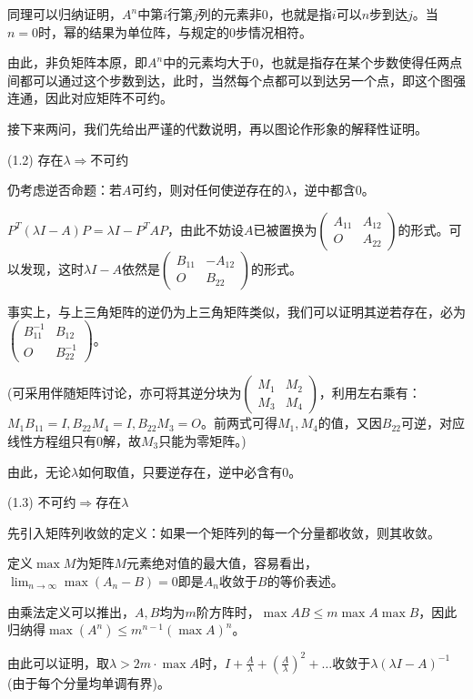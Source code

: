 \documentclass[a4paper,UTF8,fontset=windows]{ctexart}
\begin{document}
\begin{enumerate}
同理可以归纳证明，$A^n$中第$i$行第$j$列的元素非0，也就是指$i$可以$n$步到达$j$。当$n=0$时，幂的结果为单位阵，与规定的0步情况相符。

由此，非负矩阵本原，即$A^n$中的元素均大于0，也就是指存在某个步数使得任两点间都可以通过这个步数到达，此时，当然每个点都可以到达另一个点，即这个图强连通，因此对应矩阵不可约。

接下来两问，我们先给出严谨的代数说明，再以图论作形象的解释性证明。

(1.2) 存在$\lambda\Rightarrow$不可约

仍考虑逆否命题：若$A$可约，则对任何使逆存在的$\lambda$，逆中都含0。

$P^T\left(\lambda I-A\right)P=\lambda I-P^TAP$，由此不妨设$A$已被置换为$\begin{pmatrix}A_{11}&A_{12}\\O&A_{22}\end{pmatrix}$的形式。可以发现，这时$\lambda I-A$依然是$\begin{pmatrix}B_{11}&-A_{12}\\O&B_{22}\end{pmatrix}$的形式。

事实上，与上三角矩阵的逆仍为上三角矩阵类似，我们可以证明其逆若存在，必为$\begin{pmatrix}B_{11}^{-1}&B_{12}\\O&B_{22}^{-1}\end{pmatrix}$。

(可采用伴随矩阵讨论，亦可将其逆分块为$\begin{pmatrix}M_1&M_2\\M_3&M_4\end{pmatrix}$，利用左右乘有：$M_1B_{11}=I,B_{22}M_4=I,B_{22}M_3=O$。前两式可得$M_1,M_4$的值，又因$B_{22}$可逆，对应线性方程组只有0解，故$M_3$只能为零矩阵。)

由此，无论$\lambda$如何取值，只要逆存在，逆中必含有0。

(1.3) 不可约$\Rightarrow$存在$\lambda$

先引入矩阵列收敛的定义：如果一个矩阵列的每一个分量都收敛，则其收敛。

定义$\max{M}$为矩阵$M$元素绝对值的最大值，容易看出，$\lim_{n\to\infty}\max(A_n-B)=0$即是$A_n$收敛于$B$的等价表述。

由乘法定义可以推出，$A,B$均为$m$阶方阵时，$\max{AB}\le m\max{A}\max{B}$，因此归纳得$\max(A^n)\le m^{n-1}(\max A)^n$。

由此可以证明，取$\lambda>2m\cdot\max{A}$时，$I+\frac{A}{\lambda}+\left(\frac{A}{\lambda}\right)^2+\dots$收敛于$\lambda(\lambda I-A)^{-1}$ (由于每个分量均单调有界)。


\end{enumerate}
\end{document}

